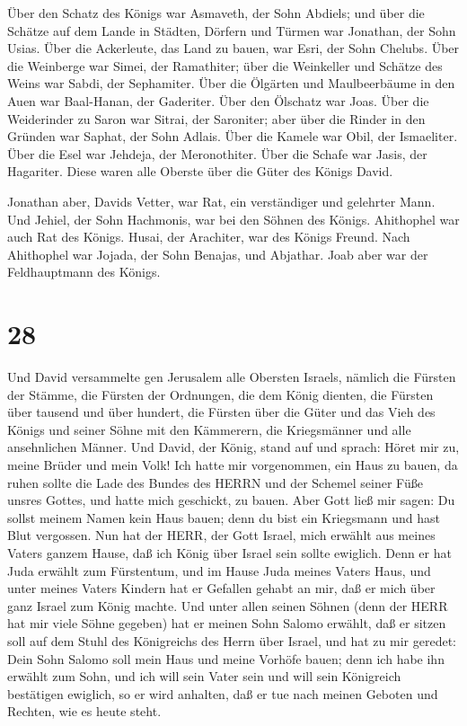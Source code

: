 Über den Schatz des Königs war Asmaveth, der Sohn Abdiels;
und über die Schätze auf dem Lande in Städten, Dörfern und Türmen war
Jonathan, der Sohn Usias.  Über die Ackerleute, das Land zu
bauen, war Esri, der Sohn Chelubs.  Über die Weinberge war
Simei, der Ramathiter; über die Weinkeller und Schätze des Weins war
Sabdi, der Sephamiter.  Über die Ölgärten und Maulbeerbäume
in den Auen war Baal-Hanan, der Gaderiter. Über den Ölschatz war Joas.
 Über die Weiderinder zu Saron war Sitrai, der Saroniter;
aber über die Rinder in den Gründen war Saphat, der Sohn Adlais.
 Über die Kamele war Obil, der Ismaeliter. Über die Esel
war Jehdeja, der Meronothiter.  Über die Schafe war Jasis,
der Hagariter. Diese waren alle Oberste über die Güter des Königs David.

 Jonathan aber, Davids Vetter, war Rat, ein verständiger
und gelehrter Mann. Und Jehiel, der Sohn Hachmonis, war bei den Söhnen
des Königs.  Ahithophel war auch Rat des Königs. Husai, der
Arachiter, war des Königs Freund.  Nach Ahithophel war
Jojada, der Sohn Benajas, und Abjathar. Joab aber war der Feldhauptmann
des Königs.

\hypertarget{section-27}{%
\section{28}\label{section-27}}

 Und David versammelte gen Jerusalem alle Obersten Israels,
nämlich die Fürsten der Stämme, die Fürsten der Ordnungen, die dem König
dienten, die Fürsten über tausend und über hundert, die Fürsten über die
Güter und das Vieh des Königs und seiner Söhne mit den Kämmerern, die
Kriegsmänner und alle ansehnlichen Männer.  Und David, der
König, stand auf und sprach: Höret mir zu, meine Brüder und mein Volk!
Ich hatte mir vorgenommen, ein Haus zu bauen, da ruhen sollte die Lade
des Bundes des HERRN und der Schemel seiner Füße unsres Gottes, und
hatte mich geschickt, zu bauen.  Aber Gott ließ mir sagen:
Du sollst meinem Namen kein Haus bauen; denn du bist ein Kriegsmann und
hast Blut vergossen.  Nun hat der HERR, der Gott Israel,
mich erwählt aus meines Vaters ganzem Hause, daß ich König über Israel
sein sollte ewiglich. Denn er hat Juda erwählt zum Fürstentum, und im
Hause Juda meines Vaters Haus, und unter meines Vaters Kindern hat er
Gefallen gehabt an mir, daß er mich über ganz Israel zum König machte.
 Und unter allen seinen Söhnen (denn der HERR hat mir viele
Söhne gegeben) hat er meinen Sohn Salomo erwählt, daß er sitzen soll auf
dem Stuhl des Königreichs des Herrn über Israel,  und hat zu
mir geredet: Dein Sohn Salomo soll mein Haus und meine Vorhöfe bauen;
denn ich habe ihn erwählt zum Sohn, und ich will sein Vater sein
 und will sein Königreich bestätigen ewiglich, so er wird
anhalten, daß er tue nach meinen Geboten und Rechten, wie es heute
steht.

